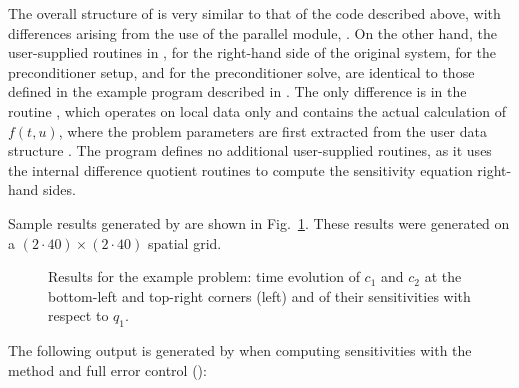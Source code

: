 The overall structure of  is very
similar to that of the code  described above, with 
differences arising from the use of the parallel {\nvector} module, {\nvecp}.
On the other hand, the user-supplied routines in ,
 for the right-hand side of the original system,
 for the preconditioner setup, and  for the
preconditioner solve, are identical to those defined in the example program
 described in \cite{cvode_ex}. The only difference is in the
routine , which operates on local data only and contains the actual 
calculation of $f(t,u)$, where the problem parameters are first extracted from the
user data structure . The program  defines no
additional user-supplied routines, as it uses the {\cvodes} internal difference quotient
routines to compute the sensitivity equation right-hand sides.

Sample results generated by  are shown in
Fig.~\ref{f:cvsDiurnal_FSA_kry_p}. 
These results were generated on a $(2\cdot40)\times(2\cdot40)$ spatial grid.
\begin{figure}
  {\centerline{}}
  \caption{Results for the  example problem:
    time evolution of $c_1$ and $c_2$ at the bottom-left and top-right corners
    (left) and of their sensitivities with respect to $q_1$.}
  \label{f:cvsDiurnal_FSA_kry_p}
\end{figure}
The following output is generated by  when computing
sensitivities with the  method and full error
control ():


